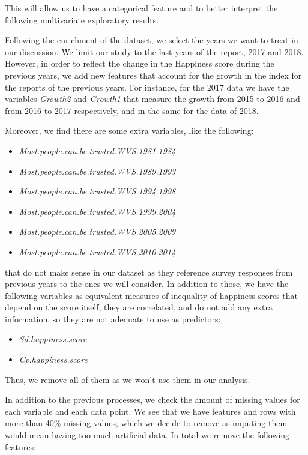 \documentclass[12pt]{extarticle}
\begin{document}
This will allow us to have a categorical feature and to better interpret the following multivariate exploratory results.

Following the enrichment of the dataset, we select the years we want to treat in our discussion. We limit our study to the last years of the report, 2017 and 2018. However, in order to reflect the change in the Happiness score during the previous years, we add new features that account for the growth in the index for the reports of the previous years. For instance, for the 2017 data we have the variables \textit{Growth2} and \textit{Growth1} that measure the growth from 2015 to 2016 and from 2016 to 2017 respectively, and in the same for the data of 2018.

Moreover, we find there are some extra variables, like the following:

\begin{itemize}
    \item \textit{Most.people.can.be.trusted.WVS.1981.1984}
    \item \textit{Most.people.can.be.trusted.WVS.1989.1993}
    \item \textit{Most.people.can.be.trusted.WVS.1994.1998}
    \item \textit{Most.people.can.be.trusted.WVS.1999.2004}
    \item \textit{Most.people.can.be.trusted.WVS.2005.2009}
    \item \textit{Most.people.can.be.trusted.WVS.2010.2014}
\end{itemize}

that do not make sense in our dataset as they reference survey responses from previous years to the ones we will consider. In addition to those, we have the following variables as equivalent measures of inequality of happiness scores that depend on the score itself, they are correlated, and do not add any extra information, so they are not adequate to use as predictors: 

\begin{itemize}
    \item \textit{Sd.happiness.score}
    \item \textit{Cv.happiness.score}
\end{itemize}


Thus, we remove all of them as we won’t use them in our analysis.

In addition to the previous processes, we check the amount of missing values for each variable and each data point. We see that we have features and rows with more than 40\% missing values, which we decide to remove as imputing them would mean having too much artificial data. In total we remove the following features:
\end{document}
